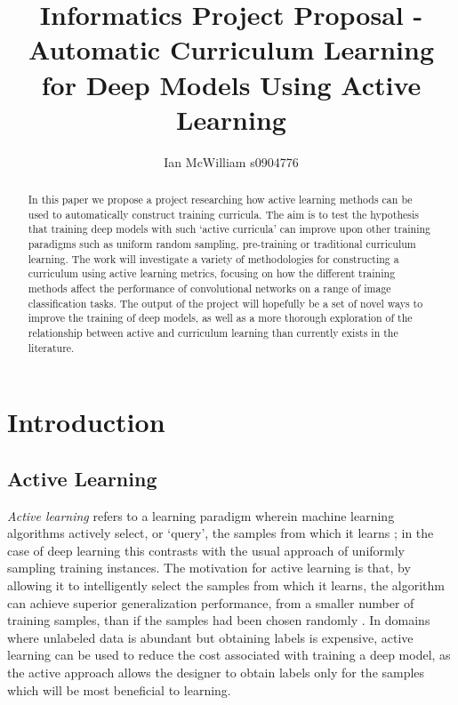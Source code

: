 \documentclass[a4paper,10pt]{article}
\begin{document}
\title{Informatics Project Proposal - Automatic Curriculum Learning for Deep Models Using Active Learning}
\author{Ian McWilliam s0904776}
\date{}
\maketitle

\begin{abstract}
In this paper we propose a project researching how active learning methods can be used to automatically construct training curricula. The aim is to test the hypothesis that training deep models with such `active curricula' can improve upon other training paradigms such as uniform random sampling, pre-training or traditional curriculum learning. The work will investigate a variety of methodologies for constructing a curriculum using active learning metrics, focusing on how the different training methods affect the performance of convolutional networks on a range of image classification tasks. The output of the project will hopefully be a set of novel ways to improve the training of deep models, as well as a more thorough exploration of the relationship between active and curriculum learning than currently exists in the literature.
\end{abstract}

\newpage

\section{Introduction}

\subsection*{Active Learning}
\textit{Active learning} refers to a learning paradigm wherein machine learning algorithms actively select, or `query', the samples from which it learns \cite{Settles 2009}; in the case of deep learning this contrasts with the usual approach of uniformly sampling training instances. The motivation for active learning is that, by allowing it to intelligently select the samples from which it learns, the algorithm can achieve superior generalization performance, from a smaller number of training samples, than if the samples had been chosen randomly \cite{Cohn 1994}. In domains where unlabeled data is abundant but obtaining labels is expensive, active learning can be used to reduce the cost associated with training a deep model, as the active approach allows the designer to obtain labels only for the samples which will be most beneficial to learning.
\end{document}
